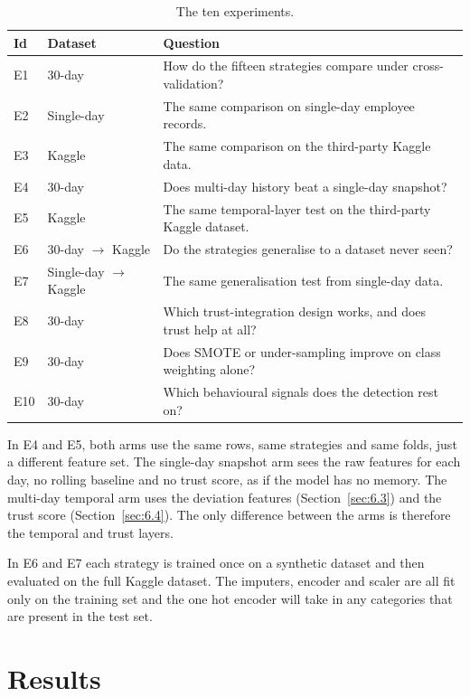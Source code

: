 \documentclass[a4paper,12pt]{article}
\begin{document}
\begin{table}[H]
\centering
\small
\begin{tabular}{llp{8.2cm}}
\toprule
Id & Dataset & Question \\
\midrule
E1 & 30-day & How do the fifteen strategies compare under cross-validation? \\
E2 & Single-day & The same comparison on single-day employee records. \\
E3 & Kaggle & The same comparison on the third-party Kaggle data. \\
E4 & 30-day & Does multi-day history beat a single-day snapshot? \\
E5 & Kaggle & The same temporal-layer test on the third-party Kaggle dataset. \\
E6 & 30-day $\rightarrow$ Kaggle & Do the strategies generalise to a dataset never seen? \\
E7 & Single-day $\rightarrow$ Kaggle & The same generalisation test from single-day data. \\
E8 & 30-day & Which trust-integration design works, and does trust help at all? \\
E9 & 30-day & Does SMOTE or under-sampling improve on class weighting alone? \\
E10 & 30-day & Which behavioural signals does the detection rest on? \\
\bottomrule
\end{tabular}
\caption{The ten experiments.}
\label{tab:experiments}
\end{table}

In E4 and E5, both arms use the same rows, same strategies and same folds, just a different feature set. The single-day snapshot arm sees the raw features for each day, no rolling baseline and no trust score, as if the model has no memory. The multi-day temporal arm uses the deviation features (Section~\ref{sec:6.3}) and the trust score (Section~\ref{sec:6.4}). The only difference between the arms is therefore the temporal and trust layers.

In E6 and E7 each strategy is trained once on a synthetic dataset and then evaluated on the full Kaggle dataset. The imputers, encoder and scaler are all fit only on the training set and the one hot encoder will take in any categories that are present in the test set.

\section{Results}
\label{sec:8}
\end{document}
